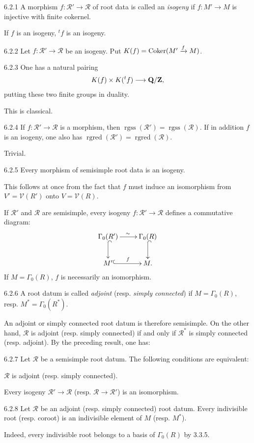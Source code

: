 \begin{definition}{6.2.1}\label{XXI.6.2.1}
A morphism $f:\mathcal R'\to\mathcal R$ of root data is called an \emph{isogeny} if $f:M'\to M$ is injective with finite cokernel.
\end{definition}
If $f$ is an isogeny, ${}^tf$ is an isogeny.
\begin{definition}{6.2.2}\label{XXI.6.2.2}
Let $f:\mathcal R'\to\mathcal R$ be an isogeny. Put $K(f)=\operatorname{Coker}(M'\xrightarrow{f}M)$.
\end{definition}
\begin{lemma}{6.2.3}\label{XXI.6.2.3}
One has a natural pairing
\[
K(f)\times K({}^tf)\longrightarrow\mathbf{Q}/\mathbf{Z},
\]
putting these two finite groups in duality.
\end{lemma}
This is classical.
\begin{lemma}{6.2.4}\label{XXI.6.2.4}
If $f:\mathcal R'\to\mathcal R$ is a morphism, then $\operatorname{rgss}(\mathcal R')=\operatorname{rgss}(\mathcal R)$. If in addition $f$ is an isogeny, one also has $\operatorname{rgred}(\mathcal R')=\operatorname{rgred}(\mathcal R)$.
\end{lemma}
Trivial.
\begin{lemma}{6.2.5}\label{XXI.6.2.5}
Every morphism of semisimple root data is an isogeny.
\end{lemma}
This follows at once from the fact that $f$ must induce an isomorphism from $V'=\mathcal V(R')$ onto $V=\mathcal V(R)$.

If $\mathcal R'$ and $\mathcal R$ are semisimple, every isogeny $f:\mathcal R'\to\mathcal R$ defines a commutative diagram:
\[
\xymatrix{\Gamma_0(R')\ar[r]^{\sim}\ar@{^{(}->}[d]&\Gamma_0(R)\ar@{^{(}->}[d]\\
M'\ar@{^{(}->}[r]^f&M.}
\]
If $M=\Gamma_0(R)$, $f$ is necessarily an isomorphism.
\begin{definition}{6.2.6}\label{XXI.6.2.6}
A root datum is called \emph{adjoint} (resp. \emph{simply connected}) if $M=\Gamma_0(R)$, resp. $M^*=\Gamma_0(R^*)$.
\end{definition}
An adjoint or simply connected root datum is therefore semisimple. On the other hand, $\mathcal R$ is adjoint (resp. simply connected) if and only if $\mathcal R^*$ is simply connected (resp. adjoint). By the preceding result, one has:
\begin{proposition}{6.2.7}\label{XXI.6.2.7}
Let $\mathcal R$ be a semisimple root datum. The following conditions are equivalent:
\begin{enumeratei}
\item $\mathcal R$ is adjoint (resp. simply connected).
\item Every isogeny $\mathcal R'\to\mathcal R$ (resp. $\mathcal R\to\mathcal R'$) is an isomorphism.
\end{enumeratei}
\end{proposition}
\begin{proposition}{6.2.8}\label{XXI.6.2.8}
Let $\mathcal R$ be an adjoint (resp. simply connected) root datum. Every indivisible root (resp. coroot) is an indivisible element of $M$ (resp. $M^*$).
\end{proposition}
Indeed, every indivisible root belongs to a basis of $\Gamma_0(R)$ by 3.3.5.

